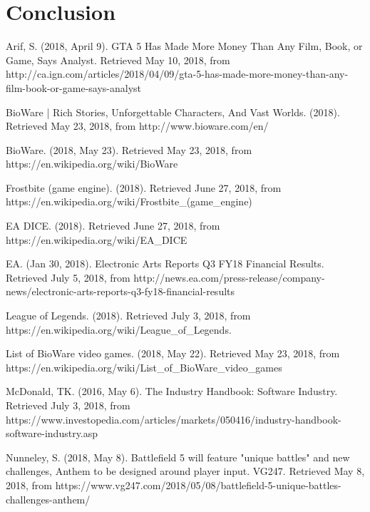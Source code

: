 \documentclass[10pt,letterpaper]{article}
\begin{document}
\clearpage
\section*{Conclusion}\label{conclusion}

\clearpage
\begin{thebibliography}{}
	
	Arif, S. (2018, April 9). GTA 5 Has Made More Money Than Any Film, Book, or Game, Says Analyst. Retrieved May 10, 2018, from http://ca.ign.com/articles/2018/04/09/gta-5-has-made-more-money-than-any-film-book-or-game-says-analyst

	BioWare | Rich Stories, Unforgettable Characters, And Vast Worlds. (2018). Retrieved May 23, 2018, from http://www.bioware.com/en/

	BioWare. (2018, May 23). Retrieved May 23, 2018, from https://en.wikipedia.org/wiki/BioWare

	Frostbite (game engine). (2018). Retrieved June 27, 2018, from https://en.wikipedia.org/wiki/Frostbite\_(game\_engine)

	EA DICE. (2018). Retrieved June 27, 2018, from https://en.wikipedia.org/wiki/EA\_DICE

	EA. (Jan 30, 2018). Electronic Arts Reports Q3 FY18 Financial Results. Retrieved July 5, 2018, from http://news.ea.com/press-release/company-news/electronic-arts-reports-q3-fy18-financial-results

	League of Legends. (2018). Retrieved July 3, 2018, from https://en.wikipedia.org/wiki/League\_of\_Legends.

	List of BioWare video games. (2018, May 22). Retrieved May 23, 2018, from https://en.wikipedia.org/wiki/List\_of\_BioWare\_video\_games

	McDonald, TK. (2016, May 6). The Industry Handbook: Software Industry. Retrieved July 3, 2018, from https://www.investopedia.com/articles/markets/050416/industry-handbook-software-industry.asp

	Nunneley, S. (2018, May 8). Battlefield 5 will feature "unique battles" and new challenges, Anthem to be designed around player input. VG247. Retrieved May 8, 2018, from https://www.vg247.com/2018/05/08/battlefield-5-unique-battles-challenges-anthem/


\end{thebibliography}
\end{document}
